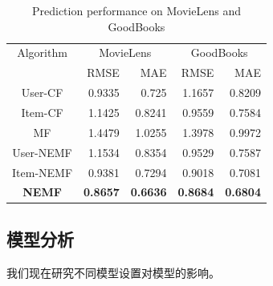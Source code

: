 \documentclass[lang=cn,11pt]{elegantpaper}
\begin{document}
\begin{table}[tbp]
	\centering
	\caption{Prediction performance on MovieLens and GoodBooks \label{tab:result}}
	\setlength{\tabcolsep}{7mm}
	
	\begin{tabular}{ccrrrr}
		\toprule
		\multicolumn{ 2}{c}{Algorithm} & \multicolumn{ 2}{c}{MovieLens} & \multicolumn{ 2}{c}{GoodBooks} \\
		
		\multicolumn{ 2}{c}{} &       RMSE &        MAE &       RMSE &        MAE \\
		\midrule
		
		\multicolumn{ 2}{c}{User-CF} &     0.9335 &      0.725 &     1.1657 &     0.8209 \\
		
		\multicolumn{ 2}{c}{Item-CF} &     1.1425 &     0.8241 &     0.9559 &     0.7584 \\
		
		\multicolumn{ 2}{c}{MF} &     1.4479 &     1.0255 &     1.3978 &     0.9972 \\
		
		\multicolumn{ 2}{c}{User-NEMF} &     1.1534 &     0.8354 &     0.9529 &     0.7587 \\
		
		\multicolumn{ 2}{c}{Item-NEMF} &     0.9381 &     0.7294 &     0.9018 &     0.7081 \\
		
		\multicolumn{ 2}{c}{\textbf{NEMF}} &     \textbf{0.8657} &     \textbf{0.6636} &     \textbf{0.8684} &     \textbf{0.6804} \\
		\bottomrule
	\end{tabular} 	
\end{table}

\subsection{模型分析}

我们现在研究不同模型设置对模型的影响。

\end{document}

